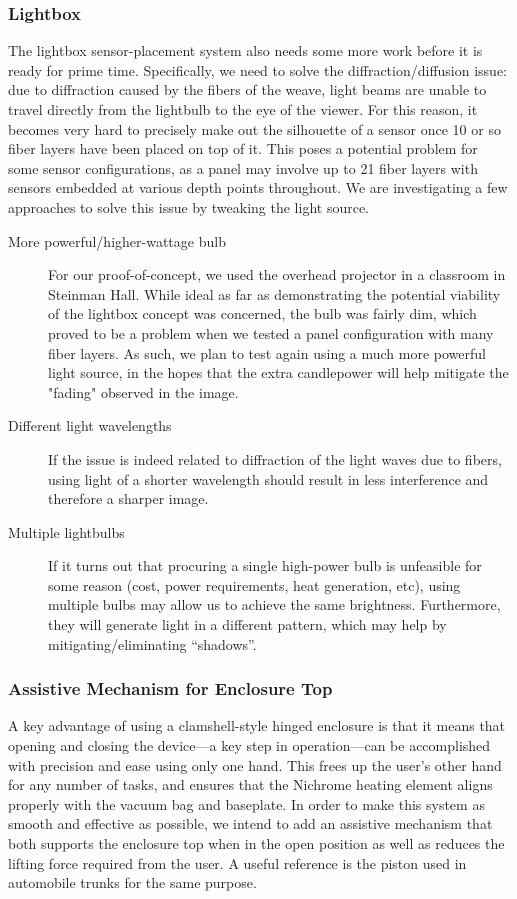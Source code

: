 \documentclass[12pt,letterpaper,notitlepage]{article}
\begin{document}
\subsubsection{Lightbox}
The lightbox sensor-placement system also needs some more work before it is ready for prime time. Specifically, we need to solve the diffraction/diffusion issue: due to diffraction caused by the fibers of the weave, light beams are unable to travel directly from the lightbulb to the eye of the viewer. For this reason, it becomes very hard to precisely make out the silhouette of a sensor once 10 or so fiber layers have been placed on top of it. This poses a potential problem for some sensor configurations, as a panel may involve up to 21 fiber layers with sensors embedded at various depth points throughout.
We are investigating a few approaches to solve this issue by tweaking the light source.
\begin{description}
\item[More powerful/higher-wattage bulb] For our proof-of-concept, we used the overhead projector in a classroom in Steinman Hall. While ideal as far as demonstrating the potential viability of the lightbox concept was concerned, the bulb was fairly dim, which proved to be a problem when we tested a panel configuration with many fiber layers. As such, we plan to test again using a much more powerful light source, in the hopes that the extra candlepower will help mitigate the "fading" observed in the image.
\item[Different light wavelengths] If the issue is indeed related to diffraction of the light waves due to fibers, using light of a shorter wavelength should result in less interference and therefore a sharper image.
\item[Multiple lightbulbs] If it turns out that procuring a single high-power bulb is unfeasible for some reason (cost, power requirements, heat generation, etc), using multiple bulbs may allow us to achieve the same brightness. Furthermore, they will generate light in a different pattern, which may help by mitigating/eliminating ``shadows''.
\end{description}

\subsubsection{Assistive Mechanism for Enclosure Top}
A key advantage of using a clamshell-style hinged enclosure is that it means that opening and closing the device---a key step in operation---can be accomplished with precision and ease using only one hand. This frees up the user's other hand for any number of tasks, and ensures that the Nichrome heating element aligns properly with the vacuum bag and baseplate. In order to make this system as smooth and effective as possible, we intend to add an assistive mechanism that both supports the enclosure top when in the open position as well as reduces the lifting force required from the user. A useful reference is the piston used in automobile trunks for the same purpose.\\
\end{document}
